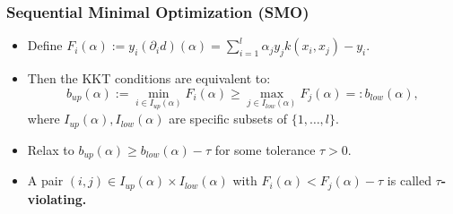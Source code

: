 \documentclass[12pt, compress]{beamer}
\newcommand{\titleC}{Sequential Minimal Optimization (SMO)}
\begin{document}
\begin{frame}
\frametitle{\titleC}
\begin{itemize}
	\item Define $F_i(\alpha) := y_i (\partial_i d)(\alpha) = \sum_{i = 1}^l \alpha_j y_j k(x_i,x_j) - y_i$.
	\item Then the KKT conditions are equivalent to:
	\begin{equation*}\label{equiv_KKT}
	b_{up}(\alpha) := \min_{i \in I_{up}(\alpha)} F_i(\alpha) \geq \max_{j \in I_{low}(\alpha)} F_j(\alpha) =: b_{low}(\alpha),
	\end{equation*}
	where $I_{up}(\alpha), I_{low}(\alpha)$ are specific subsets of $\{1,\ldots,l\}$.
	
	\item Relax to $b_{up}(\alpha) \geq b_{low}(\alpha) - \tau$ for some tolerance $\tau > 0$.
	\item A pair $(i,j) \in I_{up}(\alpha) \times I_{low}(\alpha)$ with $F_i(\alpha) < F_j(\alpha) - \tau$ is called \textbf{\alert{$\tau$-violating. }}
\end{itemize}
\end{frame}
\end{document}
